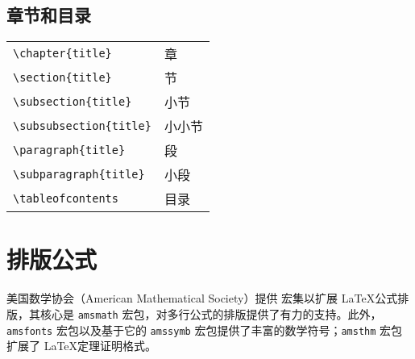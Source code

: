 \subsection{章节和目录}
\begin{table}[h]
	\centering
	\begin{tabular}{l l}
		\hline
		\verb|\chapter{|{\color{gray}\verb|title|}\verb|}|       & 章 \\
		\verb|\section{|{\color{gray}\verb|title|}\verb|}|       & 节 \\
		\verb|\subsection{|{\color{gray}\verb|title|}\verb|}|    & 小节 \\
		\verb|\subsubsection{|{\color{gray}\verb|title|}\verb|}| & 小小节 \\
		\verb|\paragraph{|{\color{gray}\verb|title|}\verb|}|     & 段 \\
		\verb|\subparagraph{|{\color{gray}\verb|title|}\verb|}|  & 小段 \\
		\verb|\tableofcontents|                                  & 目录 \\
		\hline
	\end{tabular}
\end{table}

\newpage
\section{排版公式}

美国数学协会（American Mathematical Society）提供 \AmS 宏集以扩展 \LaTeX 公式排版，其核心是 \verb|amsmath| 宏包，对多行公式的排版提供了有力的支持。此外，\verb|amsfonts| 宏包以及基于它的 \verb|amssymb| 宏包提供了丰富的数学符号；\verb|amsthm| 宏包扩展了 \LaTeX 定理证明格式。


